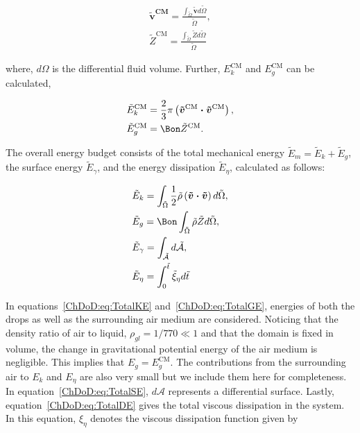 \begin{subappendices}
	\begin{align}
		\boldsymbol{\tilde{v}^\text{CM}} = \frac{\int_{\tilde{\Omega}}{\boldsymbol{\tilde{v}}d\tilde{\Omega}}}{\tilde{\Omega}},\\
		\tilde{Z}^\text{CM}= \frac{\int_{\tilde{\Omega}}{\tilde{Z}d\tilde{\Omega}}}{\tilde{\Omega}}
	\end{align}
	
	\noindent where, $d\Omega$ is the differential fluid volume. Further, $E_k^\text{CM}$ and $E_g^\text{CM}$ can be calculated,
	
	\begin{align}
		&\tilde{E}_k^\text{CM}=\frac{2}{3}\pi\left(\boldsymbol{\tilde{v}^\text{CM}\cdot \tilde{v}^\text{CM}}\right),\\
		&\tilde{E}_g^\text{CM} = \Bon \tilde{Z}^\text{CM}.
	\end{align}
	
	The overall energy budget consists of the total mechanical energy $\tilde{E}_m = \tilde{E}_k + \tilde{E}_g$, the surface energy $\tilde{E}_\gamma$, and the energy dissipation $\tilde{E}_\eta$, calculated as follows:
	
	\begin{align}
		\label{ChDoD:eq:TotalKE}
		&\tilde{E}_k = \int_{\tilde{\Omega}}\frac{1}{2}\tilde{\rho}\left(\boldsymbol{\tilde{v}\cdot\tilde{v}}\right)d\tilde{\Omega},\\
		\label{ChDoD:eq:TotalGE}
		&\tilde{E}_g = \Bon\int_{\tilde{\Omega}}\tilde{\rho}\tilde{Z}d\tilde{\Omega},\\
		\label{ChDoD:eq:TotalSE}
		&\tilde{E}_\gamma = \int_{\tilde{\mathcal{A}}}d\tilde{\mathcal{A}},\\
		\label{ChDoD:eq:TotalDE}
		&\tilde{E}_\eta = \int_0^{\tilde{t}}\tilde{\xi}_\eta d\tilde{t}
	\end{align}
	
	In equations~\eqref{ChDoD:eq:TotalKE} and~\eqref{ChDoD:eq:TotalGE}, energies of both the drops as well as the surrounding air medium are considered. Noticing that the density ratio of air to liquid, $\rho_{gl} = 1/770 \ll 1$ and that the domain is fixed in volume, the change in gravitational potential energy of the air medium is negligible. This implies that $E_g = E_g^\text{CM}$. The contributions from the surrounding air to $E_k$ and $E_\eta$ are also very small but we include them here for completeness. In equation~\ref{ChDoD:eq:TotalSE}, $d\mathcal{A}$ represents a differential surface. Lastly, equation~\ref{ChDoD:eq:TotalDE} gives the total viscous dissipation in the system. In this equation, $\xi_\eta$ denotes the viscous dissipation function given by
	

\end{subappendices}
